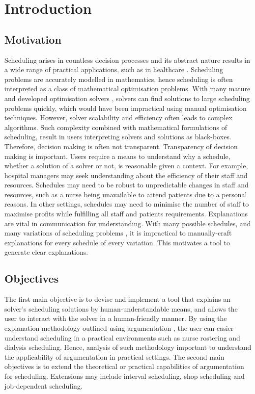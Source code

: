 \chapter{Introduction}
	
\section{Motivation}

Scheduling arises in countless decision processes and its abstract nature results in a wide range of practical applications, such as in healthcare \cite{sanr,operations}. Scheduling problems are accurately modelled in mathematics, hence scheduling is often interpreted as a class of mathematical optimisation problems. With many mature and developed optimisation solvers \cite{clp}, solvers can find solutions to large scheduling problems quickly, which would have been impractical using manual optimisation techniques. However, solver scalability and efficiency often leads to complex algorithms. Such complexity combined with mathematical formulations of scheduling, result in users interpreting solvers and solutions as black-boxes. Therefore, decision making is often not transparent.
\linespace
Transparency of decision making is important. Users require a means to understand why a schedule, whether a solution of a solver or not, is reasonable given a context. For example, hospital managers may seek understanding about the efficiency of their staff and resources. Schedules may need to be robust to unpredictable changes in staff and resources, such as a nurse being unavailable to attend patients due to a personal reasons. In other settings, schedules may need to minimise the number of staff to maximise profits while fulfilling all staff and patients requirements.
\linespace
Explanations are vital in communication for understanding. With many possible schedules, and many variations of scheduling problems \cite{sta}, it is impractical to manually-craft explanations for every schedule of every variation. This motivates a tool to generate clear explanations.

\section{Objectives}

The first main objective is to devise and implement a tool that explains an solver's scheduling solutions by human-understandable means, and allows the user to interact with the solver in a human-friendly manner. By using the explanation methodology outlined using argumentation \cite{aes}, the user can easier understand scheduling in a practical environments such as nurse rostering and dialysis scheduling. Hence, analysis of such methodology important to understand the applicability of argumentation in practical settings.
\linespace
The second main objectives is to extend the theoretical or practical capabilities of argumentation for scheduling. Extensions may include interval scheduling, shop scheduling and job-dependent scheduling.

